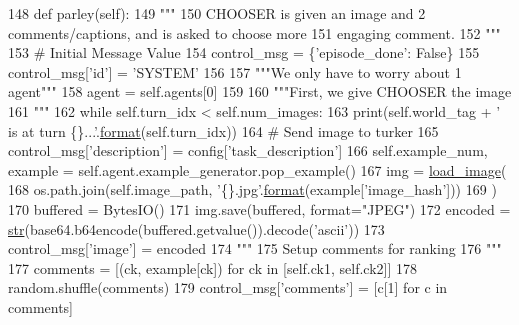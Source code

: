 \begin{DoxyCode}
148     \textcolor{keyword}{def }parley(self):
149         \textcolor{stringliteral}{"""}
150 \textcolor{stringliteral}{        CHOOSER is given an image and 2 comments/captions, and is asked to choose more}
151 \textcolor{stringliteral}{        engaging comment.}
152 \textcolor{stringliteral}{        """}
153         \textcolor{comment}{# Initial Message Value}
154         control\_msg = \{\textcolor{stringliteral}{'episode\_done'}: \textcolor{keyword}{False}\}
155         control\_msg[\textcolor{stringliteral}{'id'}] = \textcolor{stringliteral}{'SYSTEM'}
156 
157         \textcolor{stringliteral}{"""We only have to worry about 1 agent"""}
158         agent = self.agents[0]
159 
160         \textcolor{stringliteral}{"""First, we give CHOOSER the image}
161 \textcolor{stringliteral}{        """}
162         \textcolor{keywordflow}{while} self.turn\_idx < self.num\_images:
163             print(self.world\_tag + \textcolor{stringliteral}{' is at turn \{\}...'}.\hyperlink{namespaceparlai_1_1chat__service_1_1services_1_1messenger_1_1shared__utils_a32e2e2022b824fbaf80c747160b52a76}{format}(self.turn\_idx))
164             \textcolor{comment}{# Send image to turker}
165             control\_msg[\textcolor{stringliteral}{'description'}] = config[\textcolor{stringliteral}{'task\_description'}]
166             self.example\_num, example = self.agent.example\_generator.pop\_example()
167             img = \hyperlink{namespacepersonality__captions_1_1worlds_a2863737d97a8e8c5a1ebe9029d0d2293}{load\_image}(
168                 os.path.join(self.image\_path, \textcolor{stringliteral}{'\{\}.jpg'}.\hyperlink{namespaceparlai_1_1chat__service_1_1services_1_1messenger_1_1shared__utils_a32e2e2022b824fbaf80c747160b52a76}{format}(example[\textcolor{stringliteral}{'image\_hash'}]))
169             )
170             buffered = BytesIO()
171             img.save(buffered, format=\textcolor{stringliteral}{"JPEG"})
172             encoded = \hyperlink{namespacegenerate__task__READMEs_a5b88452ffb87b78c8c85ececebafc09f}{str}(base64.b64encode(buffered.getvalue()).decode(\textcolor{stringliteral}{'ascii'}))
173             control\_msg[\textcolor{stringliteral}{'image'}] = encoded
174             \textcolor{stringliteral}{"""}
175 \textcolor{stringliteral}{                Setup comments for ranking}
176 \textcolor{stringliteral}{            """}
177             comments = [(ck, example[ck]) \textcolor{keywordflow}{for} ck \textcolor{keywordflow}{in} [self.ck1, self.ck2]]
178             random.shuffle(comments)
179             control\_msg[\textcolor{stringliteral}{'comments'}] = [c[1] \textcolor{keywordflow}{for} c \textcolor{keywordflow}{in} comments]

\end{DoxyCode}
